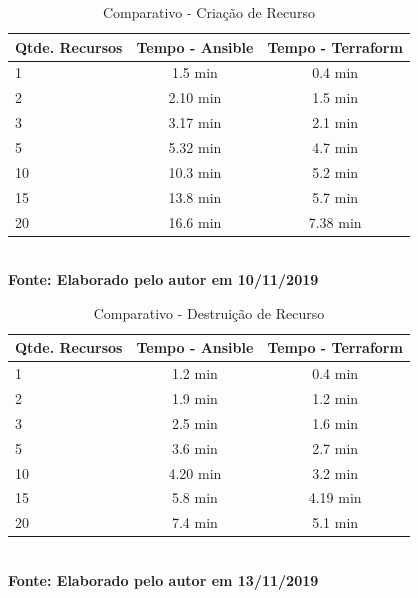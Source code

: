 \begin{table}[ht]
	\centering
	\caption{\hspace{0.1cm} Comparativo - Criação de Recurso}
	\vspace{-0.3cm} %
	\label{tab:tabela1}
	\begin{tabular}{l|c|c}
  \hline
    \textbf{Qtde. Recursos}	& \textbf{Tempo - Ansible} & \textbf{Tempo - Terraform} \\
    \hline
  1   & 1.5 min   & 0.4  min    \\
2   & 2.10  min   & 1.5  min    \\
3   & 3.17  min   & 2.1  min    \\
5   & 5.32  min   & 4.7  min     \\
10  & 10.3  min   & 5.2  min      \\
15  & 13.8  min   & 5.7  min      \\
20  & 16.6  min   & 7.38 min      \\

     \hline
 \end{tabular}
 	\vspace{.1cm}  %
	\small
	{\footnotesize\\ \textbf{Fonte:  Elaborado pelo autor em 10/11/2019}}
\end{table}


\begin{table}[ht]
	\centering
	\caption{\hspace{0.1cm} Comparativo - Destruição de Recurso}
	\vspace{-0.3cm} %
	\label{tab:tabela2}
	\begin{tabular}{l|c|c}
  \hline
    \textbf{Qtde. Recursos}	& \textbf{Tempo - Ansible} & \textbf{Tempo - Terraform} \\
    \hline
  1   & 1.2  min   & 0.4  min    \\
2   & 1.9    min   & 1.2  min    \\
3   & 2.5    min   & 1.6  min    \\
5   & 3.6    min   & 2.7  min     \\
10  & 4.20   min   & 3.2  min      \\
15  & 5.8    min   & 4.19 min      \\
20  & 7.4    min   & 5.1  min      \\

     \hline
 \end{tabular}
 	\vspace{.1cm}  %
	\small
	{\footnotesize\\ \textbf{Fonte: Elaborado pelo autor em 13/11/2019}}
\end{table}


